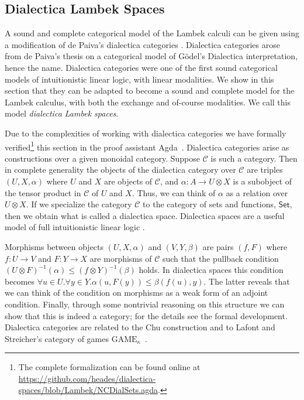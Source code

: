 \documentclass{llncs}
\let\mto\to                     %
\let\to\relax                   %
\newcommand{\to}{\rightarrow}
\newcommand{\cat}[1]{\mathcal{#1}}
\newcommand{\Set}{\mathsf{Set}}
\begin{document}
\subsection{Dialectica Lambek Spaces}
\label{sec:dialectica_lambek_spaces}

A sound and complete categorical model of  the Lambek calculi
 can be given using a modification of de Paiva's
dialectica categories \cite{depaiva1990}.  Dialectica
categories arose from de Paiva's thesis on a categorical model
of G\"odel's Dialectica interpretation, hence the name.  Dialectica
categories were one of the first sound categorical models of
intuitionistic linear logic, with  linear modalities.  We show in
this section that they can be adapted to become a sound and complete model for the Lambek calculus, with both the
exchange and of-course modalities. We call this model  \textit{dialectica Lambek spaces}.

Due to the complexities of working
with dialectica categories we have formally verified\footnote{The complete formalization can be
  found online at
  \url{https://github.com/heades/dialectica-spaces/blob/Lambek/NCDialSets.agda}.} this section in
the proof assistant Agda~\cite{bove2009}.
Dialectica categories arise as constructions over a given monoidal
category.  Suppose $\cat{C}$ is such a category.  Then in complete
generality the objects of the dialectica category over $\cat{C}$ are
triples $(U, X, \alpha)$ where $U$ and $X$ are objects of $\cat{C}$,
and $\alpha : A \mto U \otimes X$ is a subobject of the tensor product
in $\cat{C}$ of $U$ and $X$.  Thus, we can think of $\alpha$ as a
relation over $U \otimes X$.  If we specialize the category $\cat{C}$
to the category of sets and functions, $\Set$, then we obtain what is
called a dialectica space. Dialectica spaces are a useful model of
full intuitionistic linear logic \cite{Hyland:1993}.

Morphisms between objects $(U, X, \alpha)$ and $(V, Y, \beta)$ are
pairs $(f, F)$ where $f : U \mto V$ and $F : Y \mto X$ are morphisms
of $\cat{C}$ such that the pullback condition 
$(U \otimes F)^{-1}(\alpha) \leq (f \otimes Y)^{-1}(\beta)$ holds.
In dialectica spaces this condition becomes
$\forall u \in U.\forall y \in Y. \alpha(u , F(y)) \leq \beta(f(u), y)$.
The latter reveals that we can think of the condition on morphisms as
a weak form of an adjoint condition.  Finally, through some nontrivial reasoning
on this structure we can show that this is indeed a category; for the
details see the formal development.  Dialectica categories are related
to the Chu construction \cite{depaiva2007} and to Lafont and Streicher's category of games $\text{GAME}_{\kappa}$~\cite{lafont1991}.
\end{document}
